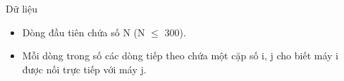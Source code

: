 Dữ liệu
\begin{itemize}
	\item     Dòng đầu tiên chứa số N (N $\le$ 300).   
	\item     Mỗi dòng trong số các dòng tiếp theo chứa một cặp số i, j cho biết máy i được nối trực tiếp với máy j.   
\end{itemize}